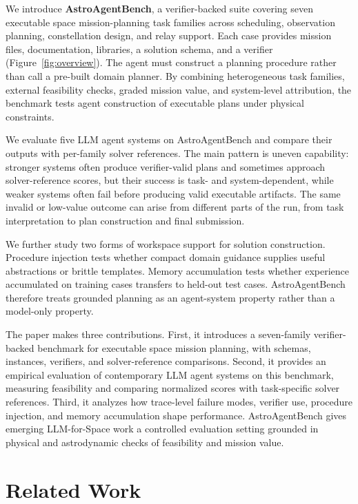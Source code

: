 \documentclass[11pt]{article}
\begin{document}
We introduce \textbf{AstroAgentBench}, a verifier-backed suite covering seven executable space mission-planning task families across scheduling, observation planning, constellation design, and relay support. Each case provides mission files, documentation, libraries, a solution schema, and a verifier (Figure~\ref{fig:overview}). The agent must construct a planning procedure rather than call a pre-built domain planner. By combining heterogeneous task families, external feasibility checks, graded mission value, and system-level attribution, the benchmark tests agent construction of executable plans under physical constraints.

We evaluate five LLM agent systems on AstroAgentBench and compare their outputs with per-family solver references. The main pattern is uneven capability: stronger systems often produce verifier-valid plans and sometimes approach solver-reference scores, but their success is task- and system-dependent, while weaker systems often fail before producing valid executable artifacts. The same invalid or low-value outcome can arise from different parts of the run, from task interpretation to plan construction and final submission.

We further study two forms of workspace support for solution construction. Procedure injection tests whether compact domain guidance supplies useful abstractions or brittle templates. Memory accumulation tests whether experience accumulated on training cases transfers to held-out test cases. AstroAgentBench therefore treats grounded planning as an agent-system property rather than a model-only property.

The paper makes three contributions. First, it introduces a seven-family verifier-backed benchmark for executable space mission planning, with schemas, instances, verifiers, and solver-reference comparisons. Second, it provides an empirical evaluation of contemporary LLM agent systems on this benchmark, measuring feasibility and comparing normalized scores with task-specific solver references. Third, it analyzes how trace-level failure modes, verifier use, procedure injection, and memory accumulation shape performance. AstroAgentBench gives emerging LLM-for-Space work a controlled evaluation setting grounded in physical and astrodynamic checks of feasibility and mission value.


\section{Related Work}
\end{document}
